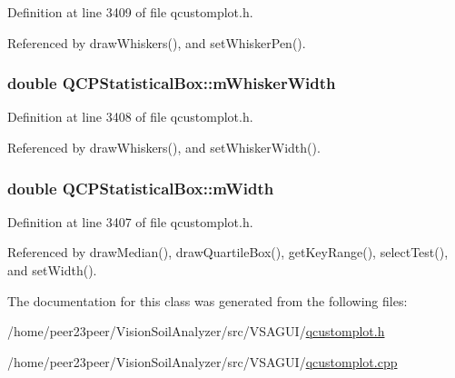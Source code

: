 Definition at line 3409 of file qcustomplot.\+h.



Referenced by draw\+Whiskers(), and set\+Whisker\+Pen().

\hypertarget{class_q_c_p_statistical_box_a4d166474f845d5db626e8b11a0815a6f}{}
\subsubsection[{m\+Whisker\+Width}]{\setlength{\rightskip}{0pt plus 5cm}double Q\+C\+P\+Statistical\+Box\+::m\+Whisker\+Width\hspace{0.3cm}{\ttfamily [protected]}}\label{class_q_c_p_statistical_box_a4d166474f845d5db626e8b11a0815a6f}


Definition at line 3408 of file qcustomplot.\+h.



Referenced by draw\+Whiskers(), and set\+Whisker\+Width().

\hypertarget{class_q_c_p_statistical_box_af365e40b0f706c3d76f857c7957f629d}{}
\subsubsection[{m\+Width}]{\setlength{\rightskip}{0pt plus 5cm}double Q\+C\+P\+Statistical\+Box\+::m\+Width\hspace{0.3cm}{\ttfamily [protected]}}\label{class_q_c_p_statistical_box_af365e40b0f706c3d76f857c7957f629d}


Definition at line 3407 of file qcustomplot.\+h.



Referenced by draw\+Median(), draw\+Quartile\+Box(), get\+Key\+Range(), select\+Test(), and set\+Width().



The documentation for this class was generated from the following files\+:\begin{DoxyCompactItemize}
\item 
/home/peer23peer/\+Vision\+Soil\+Analyzer/src/\+V\+S\+A\+G\+U\+I/\hyperlink{qcustomplot_8h}{qcustomplot.\+h}\item 
/home/peer23peer/\+Vision\+Soil\+Analyzer/src/\+V\+S\+A\+G\+U\+I/\hyperlink{qcustomplot_8cpp}{qcustomplot.\+cpp}\end{DoxyCompactItemize}
